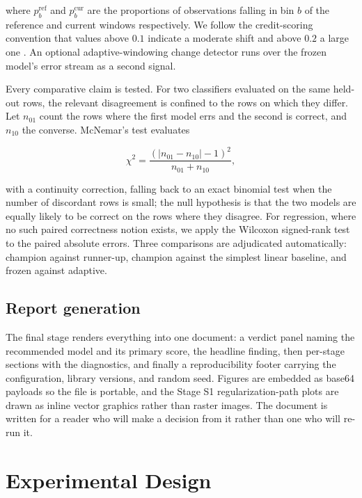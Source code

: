 \documentclass{ieeeaccess}
\begin{document}
where $p_b^{\text{ref}}$ and $p_b^{\text{cur}}$ are the proportions of observations falling in bin $b$ of the reference and current windows respectively. We follow the credit-scoring convention that values above $0.1$ indicate a moderate shift and above $0.2$ a large one \cite{siddiqi2005credit}. An optional adaptive-windowing change detector \cite{bifet2007adwin} runs over the frozen model's error stream as a second signal.

Every comparative claim is tested. For two classifiers evaluated on the same held-out rows, the relevant disagreement is confined to the rows on which they differ. Let $n_{01}$ count the rows where the first model errs and the second is correct, and $n_{10}$ the converse. McNemar's test \cite{mcnemar1947note} evaluates

\begin{equation}
\chi^2 = \frac{(|n_{01} - n_{10}| - 1)^2}{n_{01} + n_{10}},
\label{eq:mcnemar}
\end{equation}

with a continuity correction, falling back to an exact binomial test when the number of discordant rows is small; the null hypothesis is that the two models are equally likely to be correct on the rows where they disagree. For regression, where no such paired correctness notion exists, we apply the Wilcoxon signed-rank test \cite{wilcoxon1945individual} to the paired absolute errors. Three comparisons are adjudicated automatically: champion against runner-up, champion against the simplest linear baseline, and frozen against adaptive.

\subsection{Report generation}
The final stage renders everything into one document: a verdict panel naming the recommended model and its primary score, the headline finding, then per-stage sections with the diagnostics, and finally a reproducibility footer carrying the configuration, library versions, and random seed. Figures are embedded as base64 payloads so the file is portable, and the Stage S1 regularization-path plots are drawn as inline vector graphics rather than raster images. The document is written for a reader who will make a decision from it rather than one who will re-run it.

\section{Experimental Design}
\label{sec:experiments}
\end{document}
